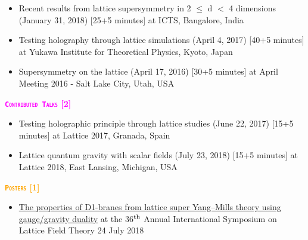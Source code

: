 \begin{itemize}
  \item Recent results from lattice supersymmetry in 2 $\le$ d $<$ 4 dimensions (January 31, 2018) [25+5 minutes] at ICTS, Bangalore, India \href{https://www.youtube.com/watch?v=Zey6DAEiw0c}{{\texttt{}}} 
 \item Testing holography through lattice simulations (April 4, 2017) [40+5 minutes]  at Yukawa Institute for Theoretical Physics, Kyoto, Japan
 \href{https://rgjha.github.io/talks/kyoto_v1.pdf}{{\texttt{\COL{[PDF]}}}}
\item Supersymmetry on the lattice (April 17, 2016) [30+5 minutes]  at April Meeting 2016 - Salt Lake City, Utah, USA
\href{https://rgjha.github.io/talks/aps_april.pdf}{{\texttt{}}} 
\end{itemize}

\textcolor{magenta}{\textbf{\textsc{\fontsize{11}{48} \bfseries \texttt{Contributed Talks} [2]}}}
\begin{itemize}
  \item Testing holographic principle through lattice studies (June 22, 2017) [15+5 minutes]  at Lattice 2017, Granada, Spain
  \item Lattice quantum gravity with scalar fields (July 23, 2018) [15+5 minutes]  at Lattice 2018, East Lansing, Michigan, USA   
\end{itemize}
 

\textcolor{orange}{\textbf{\textsc{\fontsize{11}{48} \bfseries \texttt{Posters} [1]}}}
  \begin{itemize}
 \item \href{https://indico.fnal.gov/event/15949/session/4/contribution/66}{The properties of D1-branes from lattice super Yang--Mills theory using gauge/gravity duality} at the 36$^{\rm{th}}$ Annual International Symposium on Lattice Field Theory \hfill 24 July 2018
\end{itemize}
